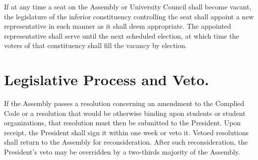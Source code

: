     If at any time a seat on the Assembly or University Council shall become vacant, the legislature of the inferior constituency controlling the seat shall appoint a new representative in such manner as it shall deem appropriate. The appointed representative shall serve until the next scheduled election, at which time the voters of that constituency shall fill the vacancy by election.

\section{Legislative Process and Veto.}
    If the Assembly passes a resolution concerning an amendment to the Complied Code or a resolution that would be otherwise binding upon students or student organizations, that resolution must then be submitted to the President. Upon receipt, the President shall sign it within one week or veto it. Vetoed resolutions shall return to the Assembly for reconsideration. After such reconsideration, the President's veto may be overridden by a  two-thirds majority of the Assembly.